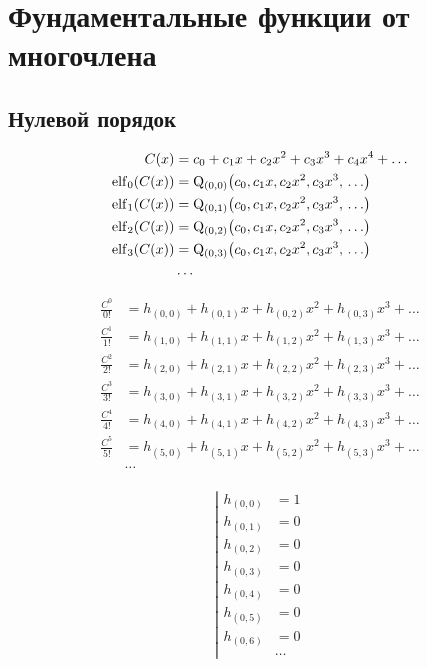 
\section{Фундаментальные функции от многочлена}

\subsection{Нулевой порядок}

\begin{equation*} \begin{aligned}
C(x) &= c_0 + c_1 x + c_2 x^2 + c_3 x^3 + c_4 x^4 + \ldots \\
\operatorname{elf}_0(C(x)) &= \mathrm{Q}_{(0,0)}{\left(c_0, c_1 x, c_2 x^2, c_3 x^3, {} \ldots \right)} \\
\operatorname{elf}_1(C(x)) &= \mathrm{Q}_{(0,1)}{\left(c_0, c_1 x, c_2 x^2, c_3 x^3, {} \ldots \right)} \\
\operatorname{elf}_2(C(x)) &= \mathrm{Q}_{(0,2)}{\left(c_0, c_1 x, c_2 x^2, c_3 x^3, {} \ldots \right)} \\
\operatorname{elf}_3(C(x)) &= \mathrm{Q}_{(0,3)}{\left(c_0, c_1 x, c_2 x^2, c_3 x^3, {} \ldots \right)} \\
&\ldots \\
\end{aligned} \end{equation*}

\begin{equation*} \begin{aligned}
\frac{C^0}{0!} &= h_{(0,0)} + h_{(0,1)} x + h_{(0,2)} x^2 + h_{(0,3)} x^3 + \ldots \\
\frac{C^1}{1!} &= h_{(1,0)} + h_{(1,1)} x + h_{(1,2)} x^2 + h_{(1,3)} x^3 + \ldots \\
\frac{C^2}{2!} &= h_{(2,0)} + h_{(2,1)} x + h_{(2,2)} x^2 + h_{(2,3)} x^3 + \ldots \\
\frac{C^3}{3!} &= h_{(3,0)} + h_{(3,1)} x + h_{(3,2)} x^2 + h_{(3,3)} x^3 + \ldots \\
\frac{C^4}{4!} &= h_{(4,0)} + h_{(4,1)} x + h_{(4,2)} x^2 + h_{(4,3)} x^3 + \ldots \\
\frac{C^5}{5!} &= h_{(5,0)} + h_{(5,1)} x + h_{(5,2)} x^2 + h_{(5,3)} x^3 + \ldots \\
&\ldots \\
\end{aligned} \end{equation*}

\begin{equation*} \left| \begin{aligned} 
h_{(0,0)} &= 1 \\ 
h_{(0,1)} &= 0 \\
h_{(0,2)} &= 0 \\
h_{(0,3)} &= 0 \\
h_{(0,4)} &= 0 \\
h_{(0,5)} &= 0 \\
h_{(0,6)} &= 0 \\
&\ldots
\end{aligned} \right. \end{equation*}

